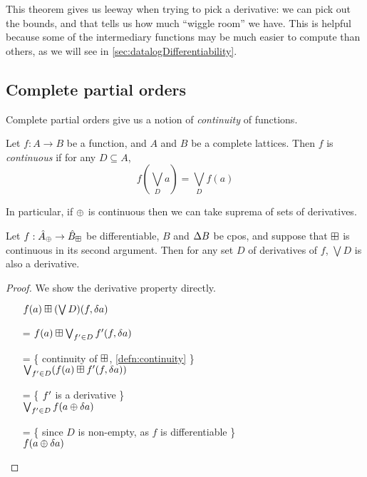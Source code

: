 This theorem gives us leeway when trying to pick a derivative: we can pick out the
bounds, and that tells us how much ``wiggle room'' we have. This is helpful
because some of the intermediary functions may be much easier to compute than
others, as we will see in \cref{sec:datalogDifferentiability}.

\subsection{Complete partial orders}

Complete partial orders give us a notion of \emph{continuity} of functions.

\begin{defn}[Continuity]
\label{defn:continuity}
  Let $f: A \rightarrow B$ be a function, and $A$ and $B$ be a
  complete lattices. Then $f$ is \textit{continuous} if for any $D \subseteq A$,
  $$f(\bigvee_D a) = \bigvee_D f(a)$$
\end{defn}

In particular, if $\oplus$ is continuous then we can take suprema of sets of derivatives.

\begin{prop}
\label{prop:supDerivatives}
  Let $f: \hat{A}_\oplus \rightarrow \hat{B}_\boxplus$ be differentiable, $B$ and
  $\Delta B$ be cpos, and suppose that $\boxplus$ is continuous
  in its second argument. Then for any set $D$ of derivatives of $f$, $\bigvee
  D$ is also a derivative.
\end{prop}
\ifproofs
\begin{proof}
  We show the derivative property directly.
  \begin{itemize}
    \item[ ]$f(a) \boxplus (\bigvee D)(f, \delta a)$
    \item[=]$f(a) \boxplus \bigvee_{f' \in D} f'(f, \delta a)$
    \item[=]\{ continuity of $\boxplus$, \cref{defn:continuity} \}\\
      $\bigvee_{f' \in D} (f(a) \boxplus f'(f, \delta a))$
    \item[=]\{ $f'$ is a derivative \}\\
      $\bigvee_{f' \in D} f(a \oplus \delta a)$
    \item[=]\{ since $D$ is non-empty, as $f$ is differentiable \}\\
      $f(a \oplus \delta a)$
  \end{itemize}
\end{proof}
\fi


